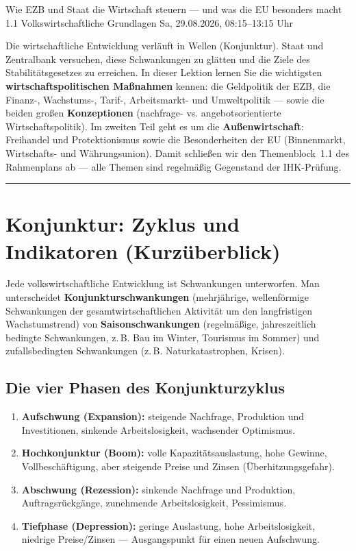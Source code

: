 \documentclass[11pt, a4paper]{article}
\begin{document}
%
  {Wie EZB und Staat die Wirtschaft steuern --- und was die EU besonders macht}%
  {1.1 Volkswirtschaftliche Grundlagen}%
  {Sa, 29.08.2026, 08:15--13:15 Uhr}

\begin{merksatz}[title={\bfseries Worum geht es in dieser Lektion?}]
Die wirtschaftliche Entwicklung verläuft in Wellen (Konjunktur). Staat und Zentralbank
versuchen, diese Schwankungen zu glätten und die Ziele des Stabilitätsgesetzes zu erreichen.
In dieser Lektion lernen Sie die wichtigsten \textbf{wirtschaftspolitischen Maßnahmen}
kennen: die Geldpolitik der EZB, die Finanz-, Wachstums-, Tarif-, Arbeitsmarkt- und
Umweltpolitik --- sowie die beiden großen \textbf{Konzeptionen} (nachfrage- vs.
angebotsorientierte Wirtschaftspolitik). Im zweiten Teil geht es um die
\textbf{Außenwirtschaft}: Freihandel und Protektionismus sowie die Besonderheiten der EU
(Binnenmarkt, Wirtschafts- und Währungsunion). Damit schließen wir den Themenblock~1.1
des Rahmenplans ab --- alle Themen sind regelmäßig Gegenstand der IHK-Prüfung.
\end{merksatz}

\tableofcontents
\vspace{1em}
\hrule
\vspace{1em}

\section{Konjunktur: Zyklus und Indikatoren (Kurzüberblick)}

Jede volkswirtschaftliche Entwicklung ist Schwankungen unterworfen. Man unterscheidet
\textbf{Konjunkturschwankungen} (mehrjährige, wellenförmige Schwankungen der
gesamtwirtschaftlichen Aktivität um den langfristigen Wachstumstrend) von
\textbf{Saisonschwankungen} (regelmäßige, jahreszeitlich bedingte Schwankungen, z.\,B.
Bau im Winter, Tourismus im Sommer) und zufallsbedingten Schwankungen (z.\,B.
Naturkatastrophen, Krisen).

\subsection{Die vier Phasen des Konjunkturzyklus}

\begin{enumerate}
  \item \textbf{Aufschwung (Expansion):} steigende Nachfrage, Produktion und
    Investitionen, sinkende Arbeitslosigkeit, wachsender Optimismus.
  \item \textbf{Hochkonjunktur (Boom):} volle Kapazitätsauslastung, hohe Gewinne,
    Vollbeschäftigung, aber steigende Preise und Zinsen (Überhitzungsgefahr).
  \item \textbf{Abschwung (Rezession):} sinkende Nachfrage und Produktion,
    Auftragsrückgänge, zunehmende Arbeitslosigkeit, Pessimismus.
  \item \textbf{Tiefphase (Depression):} geringe Auslastung, hohe Arbeitslosigkeit,
    niedrige Preise/Zinsen --- Ausgangspunkt für einen neuen Aufschwung.
\end{enumerate}
\end{document}
